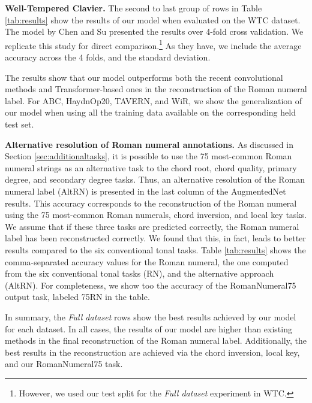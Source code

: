 \documentclass{article}
\begin{document}
\textbf{Well-Tempered Clavier.}
The second to last group of rows in Table \ref{tab:results} show the results of our model when evaluated on the WTC dataset.
The model by Chen and Su \cite{chen2021attend} presented the results over 4-fold cross validation. We replicate this study for direct comparison.\footnote{However, we used our test split for the \emph{Full dataset} experiment in WTC.} As they have, we include the average accuracy across the 4 folds, and the standard deviation. 

The results show that our model outperforms both the recent convolutional methods \cite{micchi2020not} and Transformer-based ones \cite{chen2021attend} in the reconstruction of the Roman numeral label. 
For ABC, HaydnOp20, TAVERN, and WiR, we show the generalization of our model when using all the training data available on the corresponding held test set. 

\textbf{Alternative resolution of Roman numeral annotations.}
As discussed in Section \ref{sec:additionaltasks}, it is possible to use the 75 most-common Roman numeral strings as an alternative task to the chord root, chord quality, primary degree, and secondary degree tasks. 
Thus, an alternative resolution of the Roman numeral label (AltRN) is presented in the last column of the AugmentedNet results. This accuracy corresponds to the reconstruction of the Roman numeral using the 75 most-common Roman numerals, chord inversion, and local key tasks. 
We assume that if these three tasks are predicted correctly, the Roman numeral label has been reconstructed correctly.
We found that this, in fact, leads to better results compared to the six conventional tonal tasks. 
Table \ref{tab:results} shows the comma-separated accuracy values for the Roman numeral, the one computed from the six conventional tonal tasks (RN), and the alternative approach (AltRN). For completeness, we show too the accuracy of the RomanNumeral75 output task, labeled 75RN in the table.

In summary, the \emph{Full dataset} rows show the best results achieved by our model for each dataset. In all cases, the results of our model are higher than existing methods in the final reconstruction of the Roman numeral label. Additionally, the best results in the reconstruction are achieved via the chord inversion, local key, and our RomanNumeral75 task.
\end{document}

